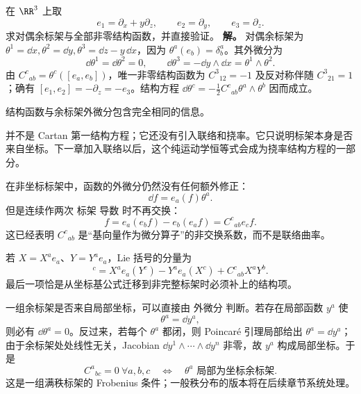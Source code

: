 \par
\begin{workedexample}
在 \(\RR^3\) 上取
\[
e_1=\partial_x+y\partial_z,
\qquad
e_2=\partial_y,
\qquad
e_3=\partial_z.
\]
求对偶余标架与全部非零结构函数，并直接验证。
\textbf{解。} 对偶余标架为 \(\theta^1=\dd x,\theta^2=\dd y,\theta^3=\dd z-y\,\dd x\)，因为 \(\theta^a(e_b)=\delta^a_b\)。其外微分为
\[
\dd\theta^1=\dd\theta^2=0,\qquad
\dd\theta^3=-\dd y\wedge\dd x=\theta^1\wedge\theta^2.
\]
由 \(C^c{}_{ab}=\theta^c([e_a,e_b])\)，唯一非零结构函数为 \(C^3{}_{12}=-1\) 及反对称伴随 \(C^3{}_{21}=1\)；确有 \([e_1,e_2]=-\partial_z=-e_3\)。结构方程 \(\dd\theta^c=-\frac12C^c{}_{ab}\theta^a\wedge\theta^b\) 因而成立。
\end{workedexample}
\par

结构函数与余标架外微分包含完全相同的信息。

并不是 Cartan 第一结构方程；它还没有引入联络和挠率。它只说明标架本身是否来自坐标。下一章加入联络以后，这个纯运动学恒等式会成为挠率结构方程的一部分。

在非坐标标架中，函数的外微分仍然没有任何额外修正：
\begin{equation*}\dd f=e_a(f)\theta^a.\end{equation*}
但是连续作两次 标架 导数 时不再交换：
\begin{equation*}[e_a,e_b]f
=e_a(e_bf)-e_b(e_af)
=C^c{}_{ab}e_cf.\end{equation*}
这已经表明 $C^c{}_{ab}$ 是“基向量作为微分算子”的非交换系数，而不是联络曲率。

若 $X=X^ae_a$、$Y=Y^ae_a$，Lie 括号的分量为
\begin{equation}
[X,Y]^c
=X^ae_a(Y^c)-Y^ae_a(X^c)
+C^c{}_{ab}X^aY^b.
\label{eq:lie-bracket-anholonomic-components}
\end{equation}
最后一项恰是从坐标基公式迁移到非完整标架时必须补上的结构项。

一组余标架是否来自局部坐标，可以直接由 外微分 判断。若存在局部函数 $y^a$ 使
\[
\theta^a=\dd y^a,
\]
则必有 $\dd\theta^a=0$。反过来，若每个 $\theta^a$ 都闭，则 Poincar\'e 引理局部给出 $\theta^a=\dd y^a$；由于余标架处处线性无关，Jacobian $\dd y^1\wedge\cdots\wedge\dd y^n$ 非零，故 $y^a$ 构成局部坐标。于是
\begin{equation*}C^a{}_{bc}=0\ \forall a,b,c
\quad\Longleftrightarrow\quad
\theta^a\text{ 局部为坐标余标架}.\end{equation*}
这是一组满秩标架的 Frobenius 条件；一般秩分布的版本将在后续章节系统处理。

